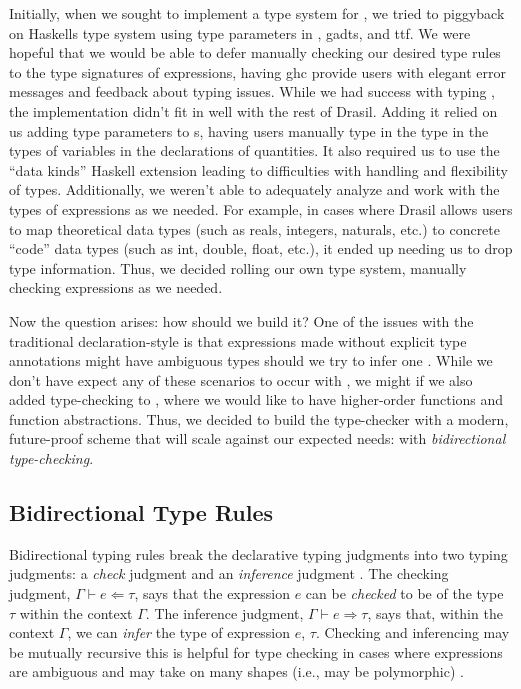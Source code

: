 Initially, when we sought to implement a type system for \Expr{}, we tried to
piggyback on Haskells type system using type parameters in \Expr{}, \acsp{gadt},
and \acs{ttf}. We were hopeful that we would be able to defer manually checking
our desired type rules to the type signatures of expressions, having \acs{ghc}
provide users with elegant error messages and feedback about typing issues.
While we had success with typing \Expr{}, the implementation didn't fit in well
with the rest of Drasil. Adding it relied on us adding type parameters to
\QuantityDict{}s, having users manually type in the type in the types of
variables in the declarations of quantities. It also required us to use the
``data kinds'' Haskell extension \cite{GHC2020DataKinds} leading to difficulties
with handling and flexibility of types. Additionally, we weren't able to
adequately analyze and work with the types of expressions as we needed. For
example, in cases where Drasil allows users to map theoretical data types (such
as reals, integers, naturals, etc.) to concrete ``code'' data types (such as
int, double, float, etc.), it ended up needing us to drop type information.
Thus, we decided rolling our own type system, manually checking expressions as
we needed.

Now the question arises: how should we build it? One of the issues with the
traditional declaration-style is that expressions made without explicit type
annotations might have ambiguous types should we try to infer one
\cite{nlab:bidirectional_typechecking}. While we don't have expect any of these
scenarios to occur with \Expr{}, we might if we also added type-checking to
\ModelExpr{}, where we would like to have higher-order functions and function
abstractions. Thus, we decided to build the type-checker with a modern,
future-proof scheme that will scale against our expected
needs\cite{CaretteDiscussion2022}: with \textit{bidirectional type-checking}.

\subsection{Bidirectional Type Rules}
\label{chap:typed-expr:sec:type-safe-expressions:subsec:bidirectional-type-rules}

Bidirectional typing rules break the declarative typing judgments into two
typing judgments: a \textit{check} judgment and an \textit{inference} judgment
\cite{Christiansen2013}. The checking judgment, \(\Gamma{} \vdash{} e \Leftarrow
\tau{}\), says that the expression \(e\) can be \textit{checked} to be of the
type \(\tau\) within the context \(\Gamma\). The inference judgment, \(\Gamma{}
\vdash{} e \Rightarrow \tau{}\), says that, within the context \(\Gamma\), we
can \textit{infer} the type of expression \(e\), \(\tau\). Checking and
inferencing may be mutually recursive \textemdash{} this is helpful for type
checking in cases where expressions are ambiguous and may take on many shapes
(i.e., may be polymorphic) \cite{nlab:bidirectional_typechecking}.

